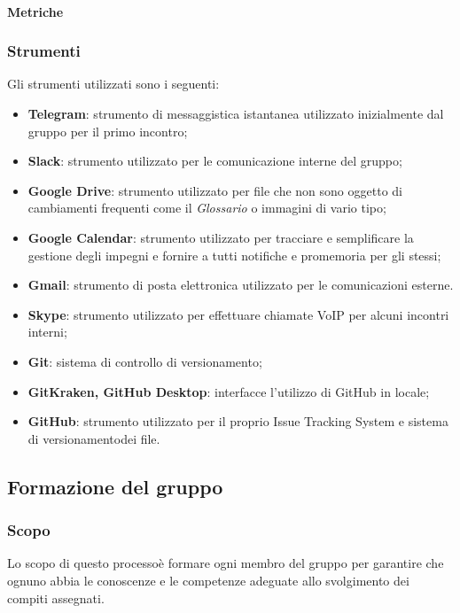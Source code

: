 			\paragraph{Metriche}
				
		\subsubsection{Strumenti}
			Gli strumenti utilizzati sono i seguenti:
			\begin{itemize}
				\item \textbf{Telegram}\glo: strumento di messaggistica istantanea utilizzato inizialmente dal gruppo per il primo incontro;
				\item \textbf{Slack}\glo: strumento utilizzato per le comunicazione interne del gruppo;
				\item \textbf{Google Drive}: strumento utilizzato per file che non sono oggetto di cambiamenti frequenti come il \textit{Glossario} o immagini di vario tipo;
				\item \textbf{Google Calendar}: strumento utilizzato per tracciare e semplificare la gestione degli impegni e fornire a tutti notifiche e promemoria per gli stessi;
				\item \textbf{Gmail}: strumento di posta elettronica utilizzato per le comunicazioni esterne.
				\item \textbf{Skype}: strumento utilizzato per effettuare chiamate VoIP per alcuni incontri interni;
				\item \textbf{Git}: sistema di controllo di versionamento\glo;
				\item \textbf{GitKraken, GitHub Desktop}: interfacce l'utilizzo di GitHub in locale;
				\item \textbf{GitHub}: strumento utilizzato per il proprio Issue Tracking System e sistema di versionamento\glosp dei file.
			\end{itemize}
	\subsection{Formazione del gruppo}
		\subsubsection{Scopo}
			Lo scopo di questo processo\glosp è formare ogni membro del gruppo per garantire che ognuno abbia le conoscenze e le competenze adeguate allo svolgimento dei compiti assegnati.

